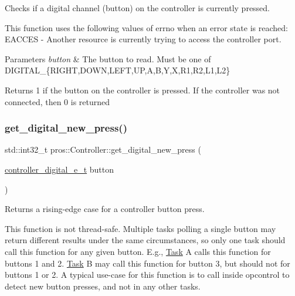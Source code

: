 Checks if a digital channel (button) on the controller is currently pressed.

This function uses the following values of errno when an error state is reached\+: E\+A\+C\+C\+ES -\/ Another resource is currently trying to access the controller port.


\begin{DoxyParams}{Parameters}
{\em button} & The button to read. Must be one of D\+I\+G\+I\+T\+A\+L\+\_\+\{R\+I\+G\+HT,D\+O\+WN,L\+E\+FT,UP,A,B,Y,X,R1,R2,L1,L2\}\\
\hline
\end{DoxyParams}
\begin{DoxyReturn}{Returns}
1 if the button on the controller is pressed. If the controller was not connected, then 0 is returned 
\end{DoxyReturn}
\mbox{\label{classpros_1_1Controller_a9dc7dc6028431d3f8f9aff0fc7a4bed6}} 
\subsubsection{\texorpdfstring{get\+\_\+digital\+\_\+new\+\_\+press()}{get\_digital\_new\_press()}}
{\footnotesize\ttfamily std\+::int32\+\_\+t pros\+::\+Controller\+::get\+\_\+digital\+\_\+new\+\_\+press (\begin{DoxyParamCaption}\item[{\hyperlink{misc_8h_a8c380ff02828ee53954bc0ce274253ed}{controller\+\_\+digital\+\_\+e\+\_\+t}}]{button }\end{DoxyParamCaption})}

Returns a rising-\/edge case for a controller button press.

This function is not thread-\/safe. Multiple tasks polling a single button may return different results under the same circumstances, so only one task should call this function for any given button. E.\+g., \hyperlink{classpros_1_1Task}{Task} A calls this function for buttons 1 and 2. \hyperlink{classpros_1_1Task}{Task} B may call this function for button 3, but should not for buttons 1 or 2. A typical use-\/case for this function is to call inside opcontrol to detect new button presses, and not in any other tasks.

